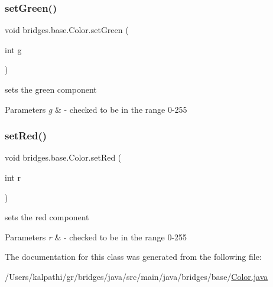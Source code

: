 \subsubsection{\texorpdfstring{setGreen()}{setGreen()}}
{\footnotesize\ttfamily void bridges.\+base.\+Color.\+set\+Green (\begin{DoxyParamCaption}\item[{int}]{g }\end{DoxyParamCaption})}

sets the green component


\begin{DoxyParams}{Parameters}
{\em g} & -\/ checked to be in the range 0-\/255 \\
\hline
\end{DoxyParams}
\mbox{\label{classbridges_1_1base_1_1_color_a1d78967703924b709e76def5b2b3ee9a}} 
\subsubsection{\texorpdfstring{setRed()}{setRed()}}
{\footnotesize\ttfamily void bridges.\+base.\+Color.\+set\+Red (\begin{DoxyParamCaption}\item[{int}]{r }\end{DoxyParamCaption})}

\begin{DoxyVerb}sets the red component
\end{DoxyVerb}



\begin{DoxyParams}{Parameters}
{\em r} & -\/ checked to be in the range 0-\/255 \\
\hline
\end{DoxyParams}


The documentation for this class was generated from the following file\+:\begin{DoxyCompactItemize}
\item 
/\+Users/kalpathi/gr/bridges/java/src/main/java/bridges/base/\mbox{\hyperlink{_color_8java}{Color.\+java}}\end{DoxyCompactItemize}
